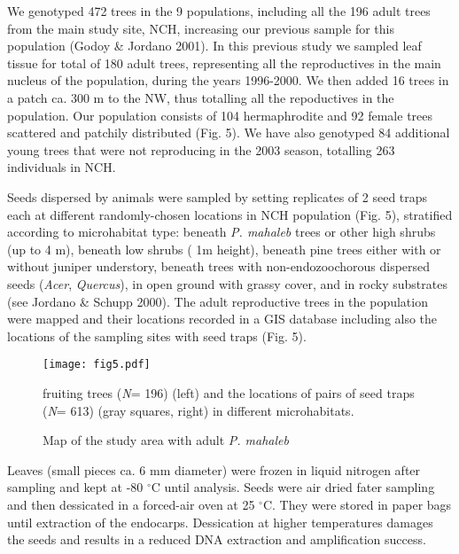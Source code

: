 \documentclass[a4paper,12pt]{article}
\newcommand{\tab}{\hspace{5mm}}
\begin{document}
\tab We genotyped 472 trees in the 9 populations, including all the 196 adult trees from the main study site, NCH, increasing our previous sample for this population (Godoy \& Jordano 2001). In this previous study we sampled leaf tissue for total of 180 adult trees, representing all the reproductives in the main nucleus of the population, during the years 1996-2000. We then added 16 trees in a patch ca. 300 m to the NW, thus totalling all the repoductives in the population. Our population consists of 104 hermaphrodite and 92 female trees scattered and patchily distributed (Fig. 5). We have also genotyped 84 additional young trees that were not reproducing in the 2003 season, totalling 263 individuals in NCH.

\tab Seeds dispersed by animals were sampled by setting replicates of 2 seed traps each at different randomly-chosen locations in NCH population (Fig. 5), stratified according to microhabitat type: beneath \textit{P. mahaleb} trees or other high shrubs (up to 4 m), beneath low shrubs (\texttt{} 1m height), beneath pine trees either with or without juniper understory, beneath trees with non-endozoochorous dispersed seeds (\textit{Acer}, \textit{Quercus}), in open ground with grassy cover, and in rocky substrates (see Jordano \& Schupp 2000). The adult reproductive trees in the population were mapped and their locations recorded in a GIS database including also the locations of the sampling sites with seed traps (Fig. 5).

 
\begin{figure}[htbp]
\centerline{\texttt{[image: fig5.pdf]}}
%
\caption{Map of the study area with adult \textit{P. mahaleb}} {\small fruiting trees (\textit{N}}{\small = 196) (left) and the locations of pairs of seed traps (\textit{N}}{\small = 613) (gray squares, right) in different microhabitats.}
\end{figure}%

\tab Leaves (small pieces ca. 6 mm diameter) were frozen in liquid nitrogen after sampling and kept at -80 \ensuremath{^\circ}C until analysis. Seeds were air dried fater sampling and then dessicated in a forced-air oven at \texttt{}25 \ensuremath{^\circ}C. They were stored in paper bags until extraction of the endocarps. Dessication at higher temperatures damages the seeds and results in a reduced DNA extraction and amplification success.
\end{document}
